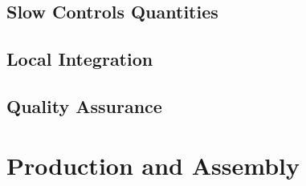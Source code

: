 \subsection{Slow Controls Quantities}
\label{sec:fddp-slow-cryo-quant}

\subsection{Local Integration}
\label{sec:fddp-slow-cryo-slow-loc-integ}

\subsection{Quality Assurance}
\label{sec:fddp-slow-cryo-slow-qa}


\section{Production and Assembly}
\label{sec:fddp-slow-cryo-prod-assy}


